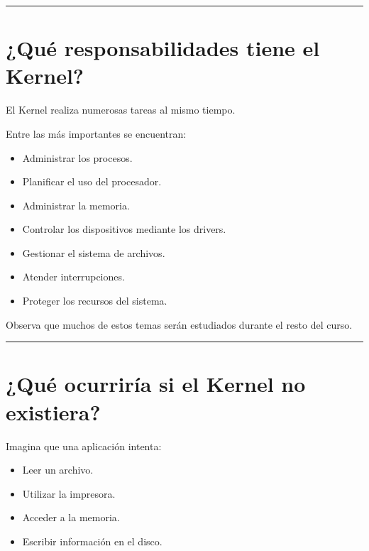 \documentclass[
  spanish,
  letterpaper,
]{scrbook}
\providecommand{\tightlist}{%
  \setlength{\itemsep}{0pt}\setlength{\parskip}{0pt}}
\begin{document}
\begin{center}\rule{0.5\linewidth}{0.5pt}\end{center}


\chapter{¿Qué responsabilidades tiene el
Kernel?}\label{quuxe9-responsabilidades-tiene-el-kernel}

El Kernel realiza numerosas tareas al mismo tiempo.

Entre las más importantes se encuentran:

\begin{itemize}
\tightlist
\item
  Administrar los procesos.
\item
  Planificar el uso del procesador.
\item
  Administrar la memoria.
\item
  Controlar los dispositivos mediante los drivers.
\item
  Gestionar el sistema de archivos.
\item
  Atender interrupciones.
\item
  Proteger los recursos del sistema.
\end{itemize}

Observa que muchos de estos temas serán estudiados durante el resto del
curso.

\begin{center}\rule{0.5\linewidth}{0.5pt}\end{center}


\chapter{¿Qué ocurriría si el Kernel no
existiera?}\label{quuxe9-ocurriruxeda-si-el-kernel-no-existiera}

Imagina que una aplicación intenta:

\begin{itemize}
\tightlist
\item
  Leer un archivo.
\item
  Utilizar la impresora.
\item
  Acceder a la memoria.
\item
  Escribir información en el disco.
\end{itemize}
\end{document}

